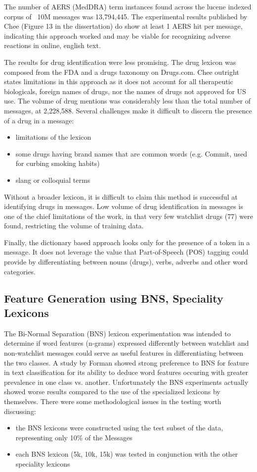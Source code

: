 \documentclass[twoside,11pt]{article}
\begin{document}
The number of AERS (MedDRA) term instances found across the lucene indexed corpus of ~10M messages was 13,794,445. The experimental results published by Chee (Figure 13 in the dissertation) do show at least 1 AERS hit per message, indicating this approach worked and may be viable for recognizing adverse reactions in online, english text.

The results for drug identification were less promising.  The drug lexicon was composed from the FDA and a drugs taxonomy on Drugs.com. Chee outright states limitations in this approach as it does not account for all therapeutic biologicals, foreign names of drugs, nor the names of drugs not approved for US use. The volume of drug mentions was considerably less than the total number of messages, at 2,228,588. Several challenges make it difficult to discern the presence of a drug in a message:
\begin{itemize}
  \item limitations of the lexicon
  \item some drugs having brand names that are common words (e.g. Commit, used for curbing smoking habits)
  \item slang or colloquial terms
\end{itemize}

Without a broader lexicon, it is difficult to claim this method is successful at identifying drugs in messages. Low volume of drug identification in messages is one of the chief limitations of the work, in that very few watchlist drugs (77) were found, restricting the volume of training data.

Finally, the dictionary based approach looks only for the presence of a token in a message. It does not leverage the value that Part-of-Speech (POS) tagging could provide by differentiating between nouns (drugs), verbs, adverbs and other word categories.


\subsection{Feature Generation using BNS, Speciality Lexicons}
The Bi-Normal Separation (BNS) lexicon experimentation was intended to determine if word features (n-grams) expressed differently between watchlist and non-watchlist messages could serve as useful features in differentiating between the two classes. A study by Forman \citep{Forman} showed strong preference to BNS for feature in text classification for its ability to deduce word features occuring with greater prevalence in one class vs. another. Unfortunately the BNS experiments actually showed worse results compared to the use of the specialized lexicons by themselves. There were some methodological issues in the testing worth discussing:
\begin{itemize}
  \item the BNS lexicons were constructed using the test subset of the data, representing only 10\% of the Messages
  \item each BNS lexicon (5k, 10k, 15k) was tested in conjunction with the other speciality lexicons
\end{itemize}
\end{document}

